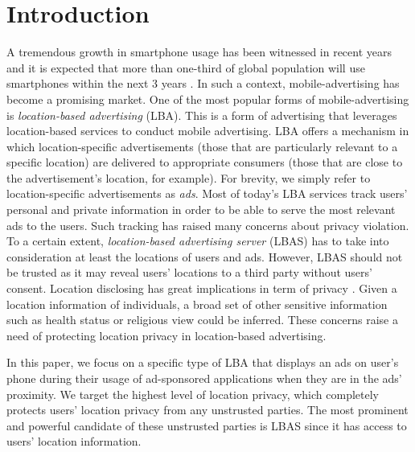 \section{Introduction}
\label{sec:intro}


A tremendous growth in smartphone usage has been witnessed in recent years and it is expected that more than one-third of global population will use smartphones within the next 3 years \cite{smartphone_growth}. In such a context, mobile-advertising has become a promising market. One of the most popular forms of mobile-advertising is \textit{location-based advertising} (LBA). This is a form of advertising that leverages location-based services to conduct mobile advertising. LBA offers a mechanism in which location-specific advertisements (those that are particularly relevant to a specific location) are delivered to appropriate consumers (those that are close to the advertisement's location, for example). For brevity, we simply refer to location-specific advertisements as \textit{ads}. 
Most of today's LBA services track users' personal and private information in order to be able to serve the most relevant ads to the users. Such tracking has raised many concerns about privacy violation. To a certain extent, \textit{location-based advertising server} (LBAS) has to take into consideration at least the locations of users and ads. However, LBAS should not be trusted as it may reveal users' locations to a third party without users' consent. Location disclosing has great implications in term of privacy \cite{No_Need_Anonymizer, DP_Spaial_Decomposition}. Given a location information of individuals, a broad set of other sensitive information such as health status or religious view could be inferred\cite{No_Need_Anonymizer}. These concerns raise a need of protecting location privacy in location-based advertising.

In this paper, we focus on a specific type of LBA that displays an ads on user's phone during their usage of ad-sponsored applications when they are in the ads' proximity. We target the highest level of location privacy, which completely protects users' location privacy from any unstrusted parties. The most prominent and powerful candidate of these unstrusted parties is LBAS since it has access to users' location information.


